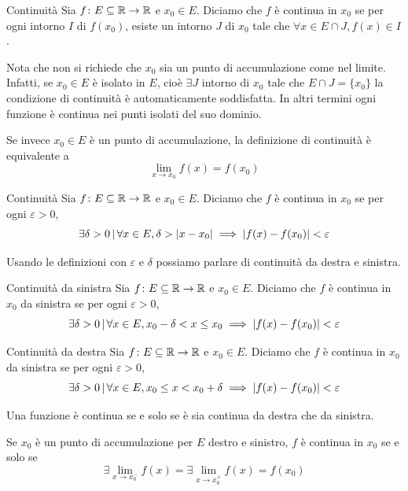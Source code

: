 \documentclass[a4paper]{article}
\begin{document}
\begin{radioactive}
\begin{snippetdefinition}{Continuità}
    Sia \(f\colon E \subseteq \mathbb{R} \to \mathbb{R}\) e \(x_0\in E\).
    Diciamo che \(f\) è continua in \(x_0\) se per ogni intorno \(I\)
    di \(f(x_0)\), esiste un intorno \(J\) di \(x_0\) tale che \(\forall x\in E\cap J, f(x)\in I\).
\end{snippetdefinition}

Nota che non si richiede che \(x_0\) sia un punto di accumulazione come nel limite.
Infatti, se \(x_0\in E\)  è isolato in \(E\),
cioè \(\exists J\) intorno di \(x_0\) tale che \(E\cap J =\{x_0\}\)
la condizione di continuità è automaticamente soddisfatta.
In altri termini ogni funzione è continua nei punti isolati del suo dominio.

Se invece \(x_0\in E\) è un punto di accumulazione, la definizione di continuità è equivalente a
\[
    \lim_{x\to x_0}f(x)=f(x_0)
\]

\begin{snippetdefinition}{Continuità}
    Sia \(f\colon E \subseteq \mathbb{R} \to \mathbb{R}\) e \(x_0\in E\).
    Diciamo che \(f\) è continua in \(x_0\) se per ogni \(\varepsilon>0\),
    \[
        \exists \delta>0 \,|\, \forall x\in E, \delta > |x-x_0|
        \implies |f(x) - f(x_0)|<\varepsilon
    \]
\end{snippetdefinition}

Usando le definizioni con \(\varepsilon\) e \(\delta\) possiamo parlare di continuità da destra e sinistra.

\begin{snippetdefinition}{Continuità da sinistra}
    Sia \(f\colon E \subseteq \mathbb{R} \to \mathbb{R}\) e \(x_0\in E\).
    Diciamo che \(f\) è continua in \(x_0\) da sinistra se per ogni \(\varepsilon>0\),
    \[
        \exists \delta>0 \,|\, \forall x\in E, x_0 - \delta < x \leq x_0
        \implies |f(x) - f(x_0)|<\varepsilon
    \]
\end{snippetdefinition}

\begin{snippetdefinition}{Continuità da destra}
    Sia \(f\colon E \subseteq \mathbb{R} \to \mathbb{R}\) e \(x_0\in E\).
    Diciamo che \(f\) è continua in \(x_0\) da sinistra se per ogni \(\varepsilon>0\),
    \[
        \exists \delta>0 \,|\, \forall x\in E, x_0 \leq x < x_0 + \delta
        \implies |f(x) - f(x_0)|<\varepsilon
    \]
\end{snippetdefinition}

\begin{snippetproposition}{}
    Una funzione è continua se e solo se è sia continua da destra che da sinistra.
\end{snippetproposition}

\begin{snippetproposition}{}
    Se \(x_0\) è un punto di accumulazione per \(E\) destro e sinistro, \(f\) è continua
    in \(x_0\) se e solo se
    \[
        \exists \lim_{x\to x_0^-} f(x)
        = \exists \lim_{x\to x_0^+} f(x)
        = f(x_0)
    \]
\end{snippetproposition}
\end{radioactive}
\end{document}
